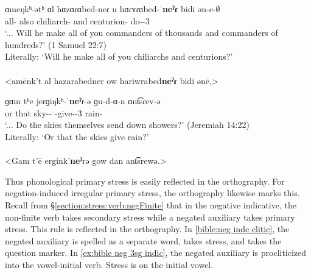 \begin{exe}
	\ex 
	\begin{xlist}
		\ex   \gll ɑmeŋkʰ-ətʰ ɑl hɑzɑɾɑbed-neɾ u hɑɾʏɾɑbed-ˈ\textbf{neˀɾ} bidi ən-e-$\emptyset$ \\
		all-{\possSsg} also chiliarch-{\pl} and centurion-{\pl} {\fut} do-{\thgloss}-3{\sg} \\
		\trans `... Will he make all of you commanders of thousands and commanders of hundreds?' \hfill (1 Samuel 22:7) \label{bible:ner}
		\\
		Literally: `Will he make all of you chiliarchs and centurions?'
		\\ 
		\\ <amēnk't al hazarabedner ow hariwrabed\textbf{neˀɾ} bidi ənē,> 
		
		\ex \gll ɡɑm tʰe jeɾɡiŋkʰ-ˈ\textbf{neˀ}ɾ-ə ɡu-d-ɑ-n ɑnt͡sɾev-ə \\
		or that sky-{\pl}-{} {\ind}-give-{\thgloss}-3{\pl} rain-{} \\
		\trans `... Do the skies themselves send down showers?' \hfill (Jeremiah 14:22) \label{bible:ner schwa}
		\\
		Literally: `Or that the skies give rain?'  
		\\ 
		\\ <Gam t'ē ergink'\textbf{neˀ}rə gow dan ant͡srewə.> 
		
	\end{xlist}
\end{exe}


Thus phonological primary stress is easily reflected in the orthography. For negation-induced irregular primary stress, the orthography likewise marks this. Recall from \S\ref{section:stress:verb:negFinite} that in the negative indicative, the non-finite verb takes secondary stress while a negated auxiliary takes primary stress. This rule is reflected in the orthography. In \ref{bible:neg indc clitic}, the negated auxiliary is spelled as a separate word, takes stress, and takes the question marker. In \ref{ex:bible neg 3sg indic}, the negated auxiliary is procliticized into the vowel-initial verb. Stress is on the initial vowel. 

